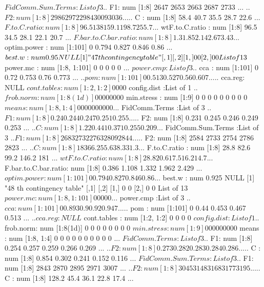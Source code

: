 \documentclass[11pt]{article} %
\begin{document}
\begin{Schunk}
\begin{Soutput}
 $ FidComm.Sum.Terms   :List of 3
  ..$ F1: num [1:8] 2647 2653 2663 2687 2733 ...
  ..$ F2: num [1:8] 2986 2972 2984 3009 3036 ...
  ..$ C : num [1:8] 58.4 40.7 35.5 28.7 22.6 ...
 $ F.to.C.ratio        : num [1:8] 96.5 138 159.1 198.7 255.7 ...
 $ wtF.to.C.ratio      : num [1:8] 96.5 34.5 28.1 22.1 20.7 ...
 $ F.bar.to.C.bar.ratio: num [1:8] 1.3 1.85 2.14 2.67 3.43 ...
 $ optim.power         : num [1:101] 0 0.794 0.827 0.846 0.86 ...
 $ best.w              : num 0.95
NULL
[1] "47 th contingency table"
     [,1] [,2]
[1,]    0    0
[2,]    0    0
List of 13
 $ power.mc            : num [1:8, 1:101] 0 0 0 0 0 ...
 $ power.cmp           :List of 3
  ..$ cca    : num [1:101] 0 0.72 0.753 0.76 0.773 ...
  ..$ pom    : num [1:101] 0 0.513 0.527 0.56 0.607 ...
  ..$ cca.reg: NULL
 $ cont.tables         : num [1:2, 1:2] 0 0 0 0
 $ config.dist         :List of 1
  ..$ frob.norm: num [1:8(1d)] 0 0 0 0 0 0 0 0
 $ min.stress          : num [1:9] 0 0 0 0 0 0 0 0 0
 $ means               : num [1:8, 1:4] 0 0 0 0 0 0 0 0 0 0 ...
 $ FidComm.Terms       :List of 3
  ..$ F1: num [1:8] 0.24 0.244 0.247 0.251 0.255 ...
  ..$ F2: num [1:8] 0.231 0.245 0.246 0.249 0.253 ...
  ..$ C : num [1:8] 1.22 0.441 0.371 0.255 0.209 ...
 $ FidComm.Sum.Terms   :List of 3
  ..$ F1: num [1:8] 2683 2732 2763 2809 2844 ...
  ..$ F2: num [1:8] 2584 2733 2754 2786 2823 ...
  ..$ C : num [1:8] 183 66.2 55.6 38.3 31.3 ...
 $ F.to.C.ratio        : num [1:8] 28.8 82.6 99.2 146.2 181 ...
 $ wtF.to.C.ratio      : num [1:8] 28.8 20.6 17.5 16.2 14.7 ...
 $ F.bar.to.C.bar.ratio: num [1:8] 0.386 1.108 1.332 1.962 2.429 ...
 $ optim.power         : num [1:101] 0 0.794 0.827 0.846 0.86 ...
 $ best.w              : num 0.925
NULL
[1] "48 th contingency table"
     [,1] [,2]
[1,]    0    0
[2,]    0    0
List of 13
 $ power.mc            : num [1:8, 1:101] 0 0 0 0 0 ...
 $ power.cmp           :List of 3
  ..$ cca    : num [1:101] 0 0.893 0.9 0.92 0.947 ...
  ..$ pom    : num [1:101] 0 0.44 0.453 0.467 0.513 ...
  ..$ cca.reg: NULL
 $ cont.tables         : num [1:2, 1:2] 0 0 0 0
 $ config.dist         :List of 1
  ..$ frob.norm: num [1:8(1d)] 0 0 0 0 0 0 0 0
 $ min.stress          : num [1:9] 0 0 0 0 0 0 0 0 0
 $ means               : num [1:8, 1:4] 0 0 0 0 0 0 0 0 0 0 ...
 $ FidComm.Terms       :List of 3
  ..$ F1: num [1:8] 0.254 0.257 0.259 0.266 0.269 ...
  ..$ F2: num [1:8] 0.273 0.282 0.283 0.284 0.286 ...
  ..$ C : num [1:8] 0.854 0.302 0.241 0.152 0.116 ...
 $ FidComm.Sum.Terms   :List of 3
  ..$ F1: num [1:8] 2843 2870 2895 2971 3007 ...
  ..$ F2: num [1:8] 3045 3148 3168 3177 3195 ...
  ..$ C : num [1:8] 128.2 45.4 36.1 22.8 17.4 ...

\end{Soutput}
\end{Schunk}
\end{document}
